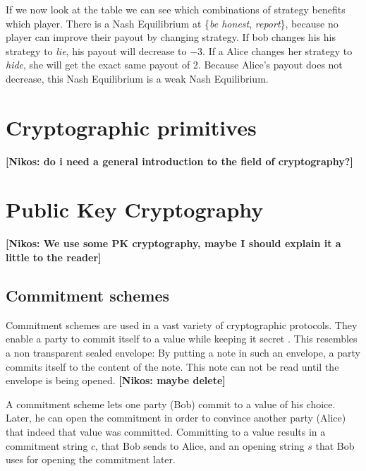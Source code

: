 \documentclass{cacthesis}
\newcommand{\authnote}[3]{{ \footnotesize \textbf{#1[#2: #3]~}}}
\newcommand{\niknote}[1]{\authnote{\color{red}}{Nikos}{#1}}
\begin{document}
If we now look at the table we can see which combinations of strategy benefits which player. There is a Nash Equilibrium at \{\emph{be honest}, \emph{report}\}, because no player can improve their payout by changing strategy. If bob changes his his strategy to \emph{lie}, his payout will decrease to $-3$. If a Alice changes her strategy to \emph{hide}, she will get the exact same payout of 2. Because Alice's payout does not decrease, this Nash Equilibrium is a weak Nash Equilibrium.

\section{Cryptographic primitives}

\niknote{do i need a general introduction to the field of cryptography?}
\section{Public Key Cryptography}
\niknote{We use some PK cryptography, maybe I should explain it a little to the reader}
\subsection{Commitment schemes}
Commitment schemes are used in a vast variety of cryptographic protocols. They enable a party to commit itself to a value while keeping it secret \cite{Goldreich2001-bv}. This resembles a non transparent sealed envelope: By putting a note in such an envelope, a party commits itself to the content of the note. This note can not be read until the envelope is being opened.  \niknote{maybe delete}\newline 

 A commitment scheme lets one party (Bob) commit to a value of his choice. Later, he can open the commitment in order to convince another party (Alice) that indeed that value was committed. Committing to a value results in a commitment string $c$, that Bob sends to Alice, and an opening string $s$ that Bob uses for opening the commitment later\cite{boneh_graduate_nodate}.\newline
 
\end{document}
